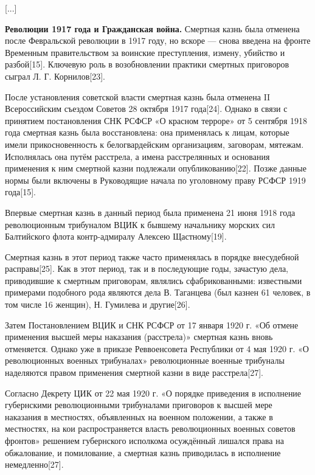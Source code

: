 [...]

\textbf{Революции 1917 года и Гражданская война.} Смертная казнь была отменена после Февральской революции в 1917 году, но вскоре — снова введена на фронте Временным правительством за воинские преступления, измену, убийство и разбой[15]. Ключевую роль в возобновлении практики смертных приговоров сыграл Л. Г. Корнилов[23].

После установления советской власти смертная казнь была отменена II Всероссийским съездом Советов 28 октября 1917 года[24]. Однако в связи с принятием постановления СНК РСФСР «О красном терроре» от 5 сентября 1918 года смертная казнь была восстановлена: она применялась к лицам, которые имели прикосновенность к белогвардейским организациям, заговорам, мятежам. Исполнялась она путём расстрела, а имена расстрелянных и основания применения к ним смертной казни подлежали опубликованию[22]. Позже данные нормы были включены в Руководящие начала по уголовному праву РСФСР 1919 года[15].

Впервые смертная казнь в данный период была применена 21 июня 1918 года революционным трибуналом ВЦИК к бывшему начальнику морских сил Балтийского флота контр-адмиралу Алексею Щастному[19].

Смертная казнь в этот период также часто применялась в порядке внесудебной расправы[25]. Как в этот период, так и в последующие годы, зачастую дела, приводившие к смертным приговорам, являлись сфабрикованными: известными примерами подобного рода являются дела В. Таганцева (был казнен 61 человек, в том числе 16 женщин), Н. Гумилева и другие[26].

Затем Постановлением ВЦИК и СНК РСФСР от 17 января 1920 г. «Об отмене применения высшей меры наказания (расстрела)» смертная казнь вновь отменяется. Однако уже в приказе Реввоенсовета Республики от 4 мая 1920 г. «О революционных военных трибуналах» революционные военные трибуналы наделяются правом применения смертной казни в виде расстрела[27].

Согласно Декрету ЦИК от 22 мая 1920 г. «О порядке приведения в исполнение губернскими революционными трибуналами приговоров к высшей мере наказания в местностях, объявленных на военном положении, а также в местностях, на кои распространяется власть революционных военных советов фронтов» решением губернского исполкома осуждённый лишался права на обжалование, и помилование, а смертная казнь приводилась в исполнение немедленно[27].

